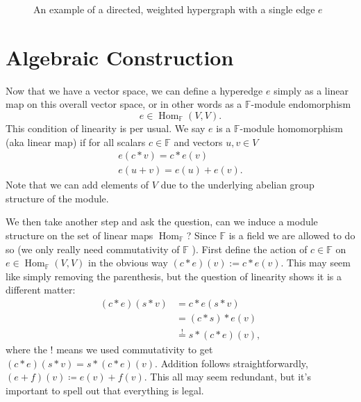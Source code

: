\documentclass{article}
\newcommand{\field}{\mathbb{F}}
\DeclareMathOperator{\Hom}{Hom}
\begin{document}
\begin{figure}
    \caption[Hypergraph]{An example of a directed, weighted hypergraph with a single edge $e$}
\end{figure}



\section{Algebraic Construction}
Now that we have a vector space, we can define a hyperedge $e$ simply as a linear map on this overall vector space, or in other words as a $\field$-module endomorphism
\begin{equation}
    e \in \Hom_{\field} (V, V).
\end{equation}
This condition of linearity is per usual. We say $e$ is a $\field$-module homomorphism (aka linear map) if for all scalars $c \in \field$ and vectors $u, v \in V$
\begin{align}
    e(c * v) = c * e(v) \\
    e (u + v) = e(u) + e(v).
\end{align}
Note that we can add elements of $V$ due to the underlying abelian group structure of the module. 

We then take another step and ask the question, can we induce a module structure on the set of linear maps $\Hom_{\field}$? Since $\field$ is a field we are allowed to do so (we only really need commutativity of $\field$ ). First define the action of $c \in \field$ on $e \in \Hom_\field(V, V)$ in the obvious way $(c * e) (v) := c * e(v)$. This may seem like simply removing the parenthesis, but the question of linearity shows it is a different matter:
\begin{align}
    (c * e) (s * v) &= c * e( s * v) \\
    &= (c * s) * e(v) \\
    &\overset{!}{=} s * (c * e) (v),
\end{align}
where the ! means we used commutativity to get $(c *e) (s * v) = s * (c * e) (v)$. Addition follows straightforwardly, $(e+f) (v) \coloneqq e(v) + f(v)$. This all may seem redundant, but it's important to spell out that everything is legal.
\end{document}
